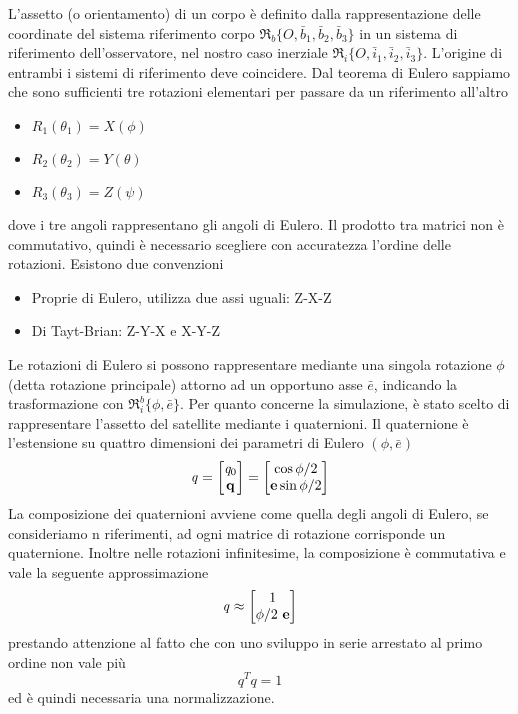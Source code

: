 L'assetto (o orientamento) di un corpo è definito dalla rappresentazione delle
coordinate del sistema riferimento corpo
$\mathfrak{R}_b\{O,\bar{b}_1,\bar{b}_2,\bar{b}_3\}$ in un sistema di riferimento
dell'osservatore, nel nostro caso inerziale
$\mathfrak{R}_i\{O,\bar{i}_1,\bar{i}_2,\bar{i}_3\}$. L'origine di entrambi i
sistemi di riferimento deve coincidere. Dal teorema di Eulero sappiamo che sono sufficienti tre rotazioni elementari per passare da un riferimento all'altro
\begin{itemize}
  \item $R_1(\theta_1)=X(\phi)$
  \item $R_2(\theta_2)=Y(\theta)$
  \item $R_3(\theta_3)=Z(\psi)$
\end{itemize}
dove i tre angoli rappresentano gli angoli di Eulero. Il prodotto tra matrici
non è commutativo, quindi è necessario scegliere con accuratezza l'ordine delle
rotazioni. Esistono due convenzioni
\begin{itemize}
  \item Proprie di Eulero, utilizza due assi uguali: Z-X-Z
  \item Di Tayt-Brian: Z-Y-X e X-Y-Z
\end{itemize}
Le rotazioni di Eulero si possono rappresentare mediante una singola rotazione
$\phi$ (detta rotazione principale) attorno ad un opportuno asse $\bar{e}$,
indicando la trasformazione con $\mathfrak{R}_i^b\{\phi,\bar{e}\}$.
Per quanto concerne la simulazione, è stato scelto di rappresentare l'assetto
del satellite mediante i quaternioni.
Il quaternione è l'estensione su quattro dimensioni dei parametri di Eulero
$(\phi,\bar{e})$
\begin{equation}
\mathit{q}=\begin{bmatrix}
\mathit{q}_0 \\ \mathit{\bf q}
\end{bmatrix} =\begin{bmatrix}
\cos{\phi/2} \\ {\bf e}\sin{\phi/2}
\end{bmatrix}
\end{equation}
La composizione dei quaternioni avviene come quella degli angoli di Eulero, se
consideriamo n riferimenti, ad ogni matrice di rotazione corrisponde un
quaternione. Inoltre nelle rotazioni infinitesime, la composizione è commutativa
e vale la seguente approssimazione
\begin{equation}
\mathit{q}\approx
\begin{bmatrix}
1\\ \phi/2 \ {\bf e}
\end{bmatrix}
\end{equation}
prestando attenzione al fatto che con uno sviluppo in serie arrestato al primo
ordine non vale più
\begin{equation}
\mathit{q}^T\mathit{q}=1
\end{equation}
ed è quindi necessaria una normalizzazione.